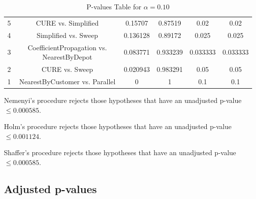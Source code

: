 \documentclass[a4paper,10pt]{article}
\begin{document}
\begin{landscape}
\begin{table}[!htp]
\begin{tabular}{cccccc}
5&CURE vs. Simplified&0.15707&0.87519&0.02&0.02\\
4&Simplified vs. Sweep&0.136128&0.89172&0.025&0.025\\
3&CoefficientPropagation vs. NearestByDepot&0.083771&0.933239&0.033333&0.033333\\
2&CURE vs. Sweep&0.020943&0.983291&0.05&0.05\\
1&NearestByCustomer vs. Parallel&0&1&0.1&0.1\\
\hline
\end{tabular}
\caption{P-values Table for $\alpha=0.10$}
\end{table}Nemenyi's procedure rejects those hypotheses that have an unadjusted p-value $\le0.000585$.

Holm's procedure rejects those hypotheses that have an unadjusted p-value $\le0.001124$.

Shaffer's procedure rejects those hypotheses that have an unadjusted p-value $\le0.000585$.

\pagebreak

\subsection{Adjusted p-values}


\end{landscape}
\end{document}
